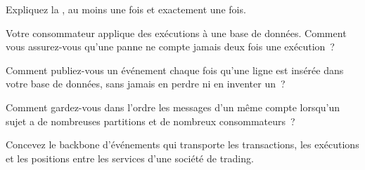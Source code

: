 \begin{interviewq}\label{iq:pl:messaging-and-event-driven-architecture:1}
Expliquez la , au moins une fois et exactement une fois.
\end{interviewq}

\begin{interviewq}\label{iq:pl:messaging-and-event-driven-architecture:2}
Votre consommateur applique des exécutions à une base de données. Comment vous assurez-vous qu'une panne ne compte jamais deux fois une exécution~?
\end{interviewq}

\begin{interviewq}\label{iq:pl:messaging-and-event-driven-architecture:3}
Comment publiez-vous un événement chaque fois qu'une ligne est insérée dans votre base de données, sans jamais en perdre ni en inventer un~?
\end{interviewq}

\begin{interviewq}\label{iq:pl:messaging-and-event-driven-architecture:4}
Comment gardez-vous dans l'ordre les messages d'un même compte lorsqu'un sujet a de nombreuses partitions et de nombreux consommateurs~?
\end{interviewq}

\begin{interviewq}\label{iq:pl:messaging-and-event-driven-architecture:5}
Concevez le backbone d'événements qui transporte les transactions, les exécutions et les positions entre les services d'une société de trading.
\end{interviewq}
